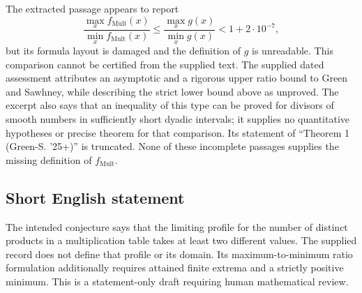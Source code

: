 \documentclass[11pt]{article}
\begin{document}
The extracted passage appears to report
\[
\frac{\max_x f_{\mathrm{Mult}}(x)}{\min_x f_{\mathrm{Mult}}(x)}
\le \frac{\max_x g(x)}{\min_x g(x)}
<1+2\cdot10^{-7},
\]
but its formula layout is damaged and the definition of \(g\) is unreadable. This comparison cannot be certified from the supplied text. The supplied dated assessment attributes an asymptotic and a rigorous upper ratio bound to Green and Sawhney, while describing the strict lower bound above as unproved. The excerpt also says that an inequality of this type can be proved for divisors of smooth numbers in sufficiently short dyadic intervals; it supplies no quantitative hypotheses or precise theorem for that comparison. Its statement of ``Theorem 1 (Green-S. '25+)'' is truncated. None of these incomplete passages supplies the missing definition of \(f_{\mathrm{Mult}}\).
\subsection{Short English statement}
The intended conjecture says that the limiting profile for the number of distinct products in a multiplication table takes at least two different values. The supplied record does not define that profile or its domain. Its maximum-to-minimum ratio formulation additionally requires attained finite extrema and a strictly positive minimum. This is a statement-only draft requiring human mathematical review.
\end{document}
